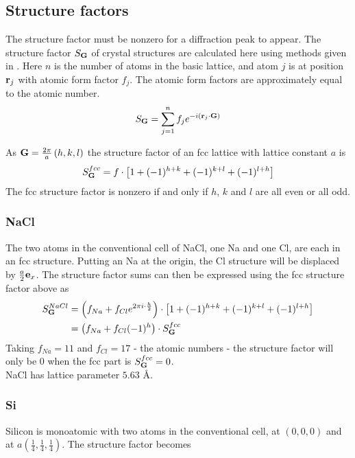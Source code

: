 \documentclass[a4paper,twoside=false,abstract=false,numbers=noenddot,
titlepage=false,headings=small,parskip=half,version=last]{scrartcl}
\begin{document}
\subsection{Structure factors}
The structure factor must be nonzero for a diffraction peak to appear.
The structure factor $S_{\bold{G}}$ of crystal structures are calculated here using methods given in \cite{Kittel}. Here $n$ is the number of atoms in the basic lattice, and atom $j$ is at position $\bold{r}_j$ with atomic form factor $f_j$. The atomic form factors are approximately equal to the atomic number.\\
\begin{equation}
    S_{\bold{G}} = \sum^n_{j=1} f_j e^{-i \left( \bold{r}_j \cdot \bold{G}\right)}\nonumber
\end{equation}

As $\bold{G} = \frac{2\pi}{a}\left( h,k,l \right)$ the structure factor of an fcc lattice with lattice constant $a$ is
\begin{equation}
    S^{fcc}_{\bold{G}} = f\cdot \left[ 1 + (-1)^{h+k} + (-1)^{k+l} + (-1)^{l+h}\right]\nonumber
\end{equation}
The fcc structure factor is nonzero if and only if $h$, $k$ and $l$ are all even or all odd.\\

\subsubsection{NaCl}
The two atoms in the conventional cell of NaCl, one Na and one Cl, are each in an fcc structure.
Putting an Na at the origin, the Cl structure will be displaced by $\frac{a}{2}\bold{e}_x$.
The structure factor sums can then be expressed using the fcc structure factor above as
\begin{align}
    S^{NaCl}_{\bold{G}}
    &= \left( f_{Na} + f_{Cl}e^{2\pi i\cdot \frac{h}{2}} \right) \cdot \left[ 1 + (-1)^{h+k} + (-1)^{k+l} + (-1)^{l+h}\right]\nonumber\\
    &= \left( f_{Na} + f_{Cl}(-1)^{h} \right) \cdot S^{fcc}_{\bold{G}}\nonumber
\end{align}
Taking $f_{Na}=11$ and $f_{Cl}=17$ - the atomic numbers - the structure factor will only be $0$ when the fcc part is $S^{fcc}_{\bold{G}}=0$.\\
NaCl has lattice parameter $5.63$ Å.

\subsubsection{Si}
Silicon is monoatomic with two atoms in the conventional cell, at $(0,0,0)$ and at $a(\frac{1}{4},\frac{1}{4},\frac{1}{4})$.
The structure factor becomes
\end{document}
